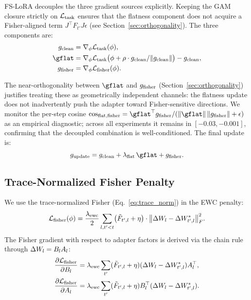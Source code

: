 FS-LoRA decouples the three gradient sources explicitly.
Keeping the GAM closure strictly on $\mathcal{L}_{\mathrm{task}}$ ensures that the flatness component
does not acquire a Fisher-aligned term $J^\top F_{t'} J\epsilon$
(see Section~\ref{sec:orthogonality}).
The three components are:
\begin{align}
  \gclean &= \nabla_\phi \Ltask(\phi), \label{eq:gclean}\\
  \gflat  &= \nabla_\phi \Ltask\bigl(\phi + \rho \cdot \gclean/\|\gclean\|\bigr)
             - \gclean, \label{eq:gflat}\\
  \gfisher &= \nabla_\phi \Lfisher(\phi). \label{eq:gfisher}
\end{align}

The near-orthogonality between $\gflat$ and $g_{\mathrm{fisher}}$ (Section~\ref{sec:orthogonality})
justifies treating these as geometrically independent channels: the flatness update does not
inadvertently push the adapter toward Fisher-sensitive directions.
We monitor the per-step cosine $\cosff = \gflat^\top\gfisher / (\|\gflat\|\,\|\gfisher\|+\epsilon)$
as an empirical diagnostic; across all experiments it remains in $[-0.03, -0.001]$,
confirming that the decoupled combination is well-conditioned.
The final update is:
\begin{equation}
  \gupdate = \gclean + \lambdaflat\,\gflat + \gfisher.
  \label{eq:update}
\end{equation}

\subsection{Trace-Normalized Fisher Penalty}
\label{sec:trace_norm}

We use the trace-normalized Fisher (Eq.~\eqref{eq:trace_norm}) in the EWC penalty:
\begin{equation}
  \mathcal{L}_{\mathrm{fisher}}(\phi) = \frac{\lambda_{\mathrm{ewc}}}{2} \sum_{l,t'<t}
  \bigl(\tilde{F}_{t',l} + \eta\bigr) \cdot \bigl\|\Delta W_l - \Delta W^*_{t',l}\bigr\|_F^2.
\end{equation}
The Fisher gradient with respect to adapter factors is derived via the chain rule
through $\Delta W_l = B_l A_l$:
\begin{align}
  \frac{\partial \mathcal{L}_{\mathrm{fisher}}}{\partial B_l} &= \lambda_{\mathrm{ewc}} \sum_{t'} (\tilde{F}_{t',l}+\eta)
    (\Delta W_l - \Delta W^*_{t',l}) A_l^\top, \\
  \frac{\partial \mathcal{L}_{\mathrm{fisher}}}{\partial A_l} &= \lambda_{\mathrm{ewc}} \sum_{t'} (\tilde{F}_{t',l}+\eta)
    B_l^\top (\Delta W_l - \Delta W^*_{t',l}).
\end{align}

